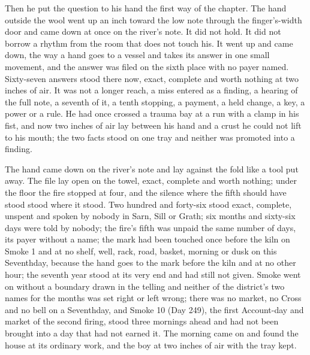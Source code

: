 Then he put the question to his hand the first way of the chapter. The hand outside the wool went up an inch toward the low note through the finger's-width door and came down at once on the river's note. It did not hold. It did not borrow a rhythm from the room that does not touch his. It went up and came down, the way a hand goes to a vessel and takes its answer in one small movement, and the answer was filed on the sixth place with no payer named. Sixty-seven answers stood there now, exact, complete and worth nothing at two inches of air. It was not a longer reach, a miss entered as a finding, a hearing of the full note, a seventh of it, a tenth stopping, a payment, a held change, a key, a power or a rule. He had once crossed a trauma bay at a run with a clamp in his fist, and now two inches of air lay between his hand and a crust he could not lift to his mouth; the two facts stood on one tray and neither was promoted into a finding.

The hand came down on the river's note and lay against the fold like a tool put away. The file lay open on the towel, exact, complete and worth nothing; under the floor the fire stopped at four, and the silence where the fifth should have stood stood where it stood. Two hundred and forty-six stood exact, complete, unspent and spoken by nobody in Sarn, Sill or Grath; six months and sixty-six days were told by nobody; the fire's fifth was unpaid the same number of days, its payer without a name; the mark had been touched once before the kiln on Smoke 1 and at no shelf, well, rack, road, basket, morning or dusk on this Seventhday, because the hand goes to the mark before the kiln and at no other hour; the seventh year stood at its very end and had still not given. Smoke went on without a boundary drawn in the telling and neither of the district's two names for the months was set right or left wrong; there was no market, no Cross and no bell on a Seventhday, and Smoke 10 (Day 249), the first Account-day and market of the second firing, stood three mornings ahead and had not been brought into a day that had not earned it. The morning came on and found the house at its ordinary work, and the boy at two inches of air with the tray kept.
